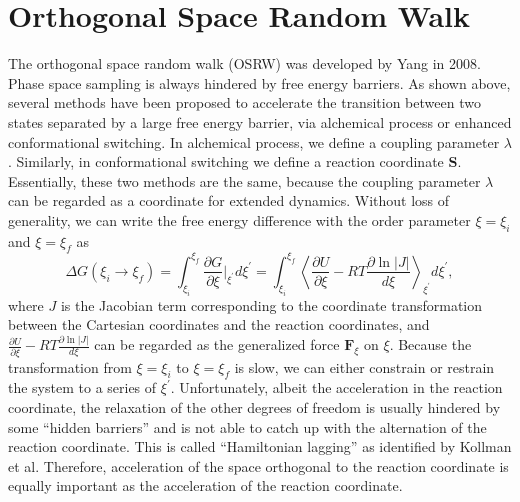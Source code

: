 \section{Orthogonal Space Random Walk\label{Sec:ES:OSRW}}
The orthogonal space random walk (OSRW) was developed by Yang in 2008.\cite{ZhengPNAS2008}
Phase space sampling is always hindered by free energy barriers. As shown above, several methods have been proposed to accelerate the transition between two states separated by a large free energy barrier, via alchemical process or enhanced conformational switching. In alchemical process, we define a coupling parameter $\lambda$. Similarly, in conformational switching we define a reaction coordinate $\mathbf{S}$. Essentially, these two methods are the same, because the coupling parameter $\lambda$ can be regarded as a coordinate for extended dynamics. Without loss of generality, we can write the free energy difference with the order parameter $\xi=\xi_i$ and $\xi=\xi_f$ as
\begin{equation}
	\Delta G(\xi_i \rightarrow \xi_f)=\int_{\xi_i}^{\xi_f}\frac{\partial G}{\partial \xi}\bigg\rvert_{\xi^\prime} d\xi^\prime=\int_{\xi_i}^{\xi_f}\left<\frac{\partial U}{\partial \xi}-RT\frac{\partial \ln{|J|}}{d\xi}\right>_{\xi^\prime}d\xi^\prime,
\end{equation}
where $J$ is the Jacobian term corresponding to the coordinate transformation between the Cartesian coordinates and the reaction coordinates, and $\frac{\partial U}{\partial \xi}-RT\frac{\partial \ln{|J|}}{d\xi}$ can be regarded as the generalized force $\mathbf{F}_\xi$ on $\xi$. Because the transformation from $\xi=\xi_i$ to $\xi=\xi_f$ is slow, we can either constrain or restrain the system to a series of $\xi^\prime$. Unfortunately, albeit the acceleration in the reaction coordinate, the relaxation of the other degrees of freedom is usually hindered by some ``hidden barriers'' and is not able to catch up with the alternation of the reaction coordinate. This is called ``Hamiltonian lagging'' as identified by Kollman et al.\cite{PearlmanJCP1989} Therefore, acceleration of the space orthogonal to the reaction coordinate is equally important as the acceleration of the reaction coordinate.

